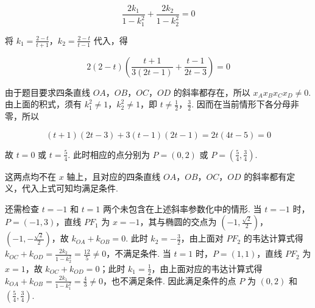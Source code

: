 \begin{solution}
\begin{enumerate}
\begin{enumerate}
\[
\frac{2k_1}{1-k_1^2}+\frac{2k_2}{1-k_2^2}=0
\]

将 \(k_1=\frac{2-t}{t+1}\)，\(k_2=\frac{2-t}{t-1}\) 代入，得

\[
2(2-t)\left(\frac{t+1}{3(2t-1)}+\frac{t-1}{2t-3}\right)=0
\]

由于题目要求四条直线 \(OA\)，\(OB\)，\(OC\)，\(OD\) 的斜率都存在，所以 \(x_Ax_Bx_Cx_D\ne0\). 由上面的积式，须有 \(k_1^2\ne1\)，\(k_2^2\ne1\)，即 \(t\ne\frac{1}{2}\)，\(\frac{3}{2}\). 因而在当前情形下各分母非零，所以

\[
(t+1)(2t-3)+3(t-1)(2t-1)=2t(4t-5)=0
\]

故 \(t=0\) 或 \(t=\frac{5}{4}\). 此时相应的点分别为 \(P=(0,2)\) 或 \(P=\left(\frac{5}{4},\frac{3}{4}\right)\).

这两点均不在 \(x\) 轴上，且对应的四条直线 \(OA\)，\(OB\)，\(OC\)，\(OD\) 的斜率都有定义，代入上式可知均满足条件.

还需检查 \(t=-1\) 和 \(t=1\) 两个未包含在上述斜率参数化中的情形. 当 \(t=-1\) 时，\(P=(-1,3)\)，直线 \(PF_1\) 为 \(x=-1\)，其与椭圆的交点为 \(\left(-1,\frac{\sqrt{2}}{2}\right)\)，\(\left(-1,-\frac{\sqrt{2}}{2}\right)\)，故 \(k_{OA}+k_{OB}=0\). 此时 \(k_2=-\frac{3}{2}\)，由上面对 \(PF_2\) 的韦达计算式得 \(k_{OC}+k_{OD}=\frac{2k_2}{1-k_2^2}=\frac{12}{5}\ne0\)，不满足条件. 当 \(t=1\) 时，\(P=(1,1)\)，直线 \(PF_2\) 为 \(x=1\)，故 \(k_{OC}+k_{OD}=0\)；此时 \(k_1=\frac{1}{2}\)，由上面对应的韦达计算式得 \(k_{OA}+k_{OB}=\frac{2k_1}{1-k_1^2}=\frac{4}{3}\ne0\)，也不满足条件. 因此满足条件的点 \(P\) 为 \((0,2)\) 和 \(\left(\frac{5}{4},\frac{3}{4}\right)\).
\end{enumerate}
\end{enumerate}
\end{solution}
